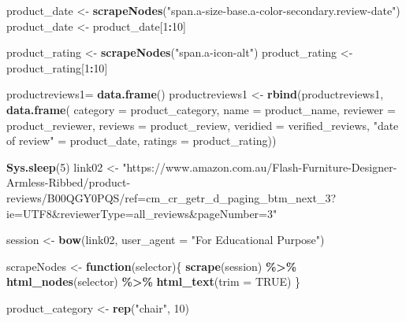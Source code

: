 \documentclass[
]{article}
\newenvironment{Shaded}{\begin{snugshade}}{\end{snugshade}}
\newcommand{\AttributeTok}[1]{\textcolor[rgb]{0.13,0.29,0.53}{#1}}
\newcommand{\ConstantTok}[1]{\textcolor[rgb]{0.56,0.35,0.01}{#1}}
\newcommand{\ControlFlowTok}[1]{\textcolor[rgb]{0.13,0.29,0.53}{\textbf{#1}}}
\newcommand{\DecValTok}[1]{\textcolor[rgb]{0.00,0.00,0.81}{#1}}
\newcommand{\FunctionTok}[1]{\textcolor[rgb]{0.13,0.29,0.53}{\textbf{#1}}}
\newcommand{\NormalTok}[1]{#1}
\newcommand{\OtherTok}[1]{\textcolor[rgb]{0.56,0.35,0.01}{#1}}
\newcommand{\SpecialCharTok}[1]{\textcolor[rgb]{0.81,0.36,0.00}{\textbf{#1}}}
\newcommand{\StringTok}[1]{\textcolor[rgb]{0.31,0.60,0.02}{#1}}
\begin{document}
\begin{Shaded}
\begin{Highlighting}[]
\NormalTok{  product\_date }\OtherTok{\textless{}{-}} \FunctionTok{scrapeNodes}\NormalTok{(}\StringTok{"span.a{-}size{-}base.a{-}color{-}secondary.review{-}date"}\NormalTok{)}
\NormalTok{  product\_date }\OtherTok{\textless{}{-}}\NormalTok{ product\_date[}\DecValTok{1}\SpecialCharTok{:}\DecValTok{10}\NormalTok{]}
  
\NormalTok{  product\_rating }\OtherTok{\textless{}{-}} \FunctionTok{scrapeNodes}\NormalTok{(}\StringTok{"span.a{-}icon{-}alt"}\NormalTok{)}
\NormalTok{  product\_rating }\OtherTok{\textless{}{-}}\NormalTok{ product\_rating[}\DecValTok{1}\SpecialCharTok{:}\DecValTok{10}\NormalTok{]}
  
\NormalTok{  productreviews1}\OtherTok{=} \FunctionTok{data.frame}\NormalTok{()}
\NormalTok{  productreviews1 }\OtherTok{\textless{}{-}} \FunctionTok{rbind}\NormalTok{(productreviews1, }\FunctionTok{data.frame}\NormalTok{(}
                      \AttributeTok{category =}\NormalTok{ product\_category,}
                      \AttributeTok{name =}\NormalTok{ product\_name,}
                      \AttributeTok{reviewer =}\NormalTok{ product\_reviewer,}
                      \AttributeTok{reviews =}\NormalTok{ product\_review,}
                      \AttributeTok{veridied =}\NormalTok{ verified\_reviews,}
                      \StringTok{"date of review"} \OtherTok{=}\NormalTok{ product\_date,}
                      \AttributeTok{ratings =}\NormalTok{ product\_rating))}

  
 \FunctionTok{Sys.sleep}\NormalTok{(}\DecValTok{5}\NormalTok{)}
\NormalTok{link02 }\OtherTok{\textless{}{-}} \StringTok{"https://www.amazon.com.au/Flash{-}Furniture{-}Designer{-}Armless{-}Ribbed/product{-}reviews/B00QGY0PQS/ref=cm\_cr\_getr\_d\_paging\_btm\_next\_3?ie=UTF8\&reviewerType=all\_reviews\&pageNumber=3"}


\NormalTok{  session }\OtherTok{\textless{}{-}} \FunctionTok{bow}\NormalTok{(link02,}
               \AttributeTok{user\_agent =} \StringTok{"For Educational Purpose"}\NormalTok{)}

\NormalTok{  scrapeNodes }\OtherTok{\textless{}{-}} \ControlFlowTok{function}\NormalTok{(selector)\{}
    \FunctionTok{scrape}\NormalTok{(session) }\SpecialCharTok{\%\textgreater{}\%}
      \FunctionTok{html\_nodes}\NormalTok{(selector) }\SpecialCharTok{\%\textgreater{}\%}
      \FunctionTok{html\_text}\NormalTok{(}\AttributeTok{trim =} \ConstantTok{TRUE}\NormalTok{)}
\NormalTok{  \}}

\NormalTok{  product\_category }\OtherTok{\textless{}{-}} \FunctionTok{rep}\NormalTok{(}\StringTok{"chair"}\NormalTok{, }\DecValTok{10}\NormalTok{)}


\end{Highlighting}
\end{Shaded}
\end{document}
